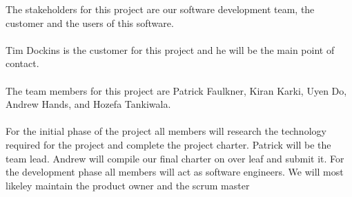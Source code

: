 
 The stakeholders for this project are our software development team, the customer and the users of this software.\\ 
 \\ Tim Dockins is the customer for this project and he will be the main point of contact.\\
\\The team members for this project are Patrick Faulkner, Kiran Karki, Uyen Do, Andrew Hands, and Hozefa Tankiwala.\\ 
 \\For the initial phase of the project all members will research the technology required for the project and complete the project charter.
 Patrick will be the team lead. Andrew will compile our final charter on over leaf and submit it. 
 For the development phase all members will act as software engineers.
 We will most likeley maintain the product owner and the scrum master
 
 
 